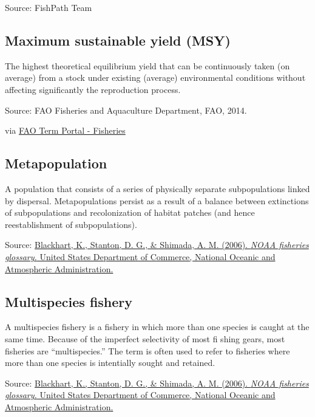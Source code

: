 \documentclass[
  11pt,
]{book}
\begin{document}
Source: FishPath Team

\hypertarget{maximum-sustainable-yield-msy}{%
\subsection{Maximum sustainable yield (MSY)}\label{maximum-sustainable-yield-msy}}

The highest theoretical equilibrium yield that can be continuously taken (on average) from a stock under existing (average) environmental conditions without affecting significantly the reproduction process.

Source: FAO Fisheries and Aquaculture Department, FAO, 2014.

via \href{http://www.fao.org/fishery/glossary/en}{FAO Term Portal - Fisheries}

\hypertarget{metapopulation}{%
\subsection{Metapopulation}\label{metapopulation}}

A population that consists of a series of physically separate subpopulations linked by dispersal.
Metapopulations persist as a result of a balance between
extinctions of subpopulations and recolonization
of habitat patches (and hence reestablishment of
subpopulations).

Source: \href{https://repository.library.noaa.gov/view/noaa/12856}{Blackhart, K., Stanton, D. G., \& Shimada, A. M. (2006). \emph{NOAA fisheries glossary.} United States Department of Commerce, National Oceanic and Atmospheric Administration.}

\hypertarget{multispecies-fishery}{%
\subsection{Multispecies fishery}\label{multispecies-fishery}}

A multispecies fishery is a fishery in which more than one species is caught at the same time. Because of the imperfect selectivity of most fi shing gears, most fisheries are ``multispecies.'' The term is often used to refer to fisheries where more than one species is intentially sought and retained.

Source: \href{https://repository.library.noaa.gov/view/noaa/12856}{Blackhart, K., Stanton, D. G., \& Shimada, A. M. (2006). \emph{NOAA fisheries glossary.} United States Department of Commerce, National Oceanic and Atmospheric Administration.}
\end{document}

